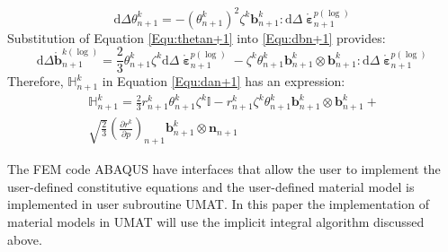 \begin{equation}
\label{Equ:thetan+1}
{\text{d}} \Delta \theta _{n + 1}^k =  - {\left( {\theta _{n + 1}^k} \right)^2}{\zeta ^k}{\mathbf{b}}_{n + 1}^k:{\text{d}}\Delta \mathring {\bm{\upepsilon}}_{n + 1}^{p(\log) }
\end{equation}
Substitution of Equation \ref{Equ:thetan+1} into \ref{Equ:dbn+1} provides:
\begin{equation}
\label{Equ:dbn+12}
\text{d} \Delta \mathring {\mathbf{b}}_{n + 1}^{k(\log) } = \frac{2}{3}\theta _{n + 1}^k{\zeta ^k}{\text{d}}\Delta \mathring {\bm{\upepsilon}}_{n + 1}^{p(\log) } - {\zeta ^k}\theta _{n + 1}^k{\mathbf{b}}_{n + 1}^k \otimes {\mathbf{b}}_{n + 1}^k:{\text{d}}\Delta \mathring {\bm{\upepsilon}}_{n + 1}^{p(\log) }
\end{equation}
Therefore, $\mathbb{H}_{n + 1}^k$ in Equation \ref{Equ:dan+1} has an expression:
\begin{equation}
\begin{aligned}
\mathbb{H}_{n + 1}^k = \frac{2}{3}r_{n + 1}^k\theta _{n + 1}^k{\zeta ^k}\mathbb{I} - r_{n + 1}^k{\zeta ^k}\theta _{n + 1}^k{\mathbf{b}}_{n + 1}^k \otimes {\mathbf{b}}_{n + 1}^k + \\
\sqrt {\frac{2}{3}} {\left( {\frac{{\partial {r^k}}}{{\partial p}}} \right)_{n + 1}}{\mathbf{b}}_{n + 1}^k \otimes {{\mathbf{n}}_{n + 1}}
\end{aligned}
\end{equation}

The FEM code ABAQUS have interfaces that allow the user to implement the user-defined constitutive equations and the user-defined material model is implemented in user subroutine UMAT.
In this paper the implementation of material models in UMAT will use the implicit integral algorithm discussed above.